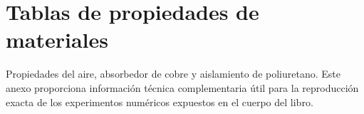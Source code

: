 \chapter{Tablas de propiedades de materiales}
\label{chap:anexoB}

Propiedades del aire, absorbedor de cobre y aislamiento de poliuretano.
Este anexo proporciona información técnica complementaria útil para la reproducción exacta de los experimentos numéricos expuestos en el cuerpo del libro.
